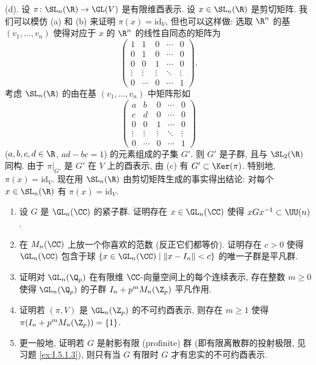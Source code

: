 \begin{solution}
(d). 设 $\pi \colon \SL_n(\R) \to \GL(V)$ 是有限维酉表示. 设 $x \in \SL_n(\R)$ 是剪切矩阵. 我们可以模仿 (a) 和 (b) 来证明 $\pi(x) = \mathrm{id}_V$, 但也可以这样做: 选取 $\R^n$ 的基 $(v_1, \ldots, v_n)$ 使得对应于 $x$ 的 $\R^n$ 的线性自同态的矩阵为
\[
\begin{pmatrix} 1 & 1 & 0 & \cdots & 0 \\ 0 & 1 & 0 & \cdots & 0 \\ 0 & 0 & 1 & \cdots & 0 \\ \vdots & \vdots & \vdots & \ddots & \vdots \\ 0 & \cdots & 0 & \cdots & 1 \end{pmatrix}.
\]
考虑 $\SL_n(\R)$ 的由在基 $(v_1, \ldots, v_n)$ 中矩阵形如
\[
\begin{pmatrix} a & b & 0 & \cdots & 0 \\ c & d & 0 & \cdots & 0 \\ 0 & 0 & 1 & \cdots & 0 \\ \vdots & \vdots & \vdots & \ddots & \vdots \\ 0 & \cdots & 0 & \cdots & 1 \end{pmatrix}
\]
($a, b, c, d \in \R$, $ad - bc = 1$) 的元素组成的子集 $G'$. 则 $G'$ 是子群, 且与 $\SL_2(\R)$ 同构. 由于 $\pi|_{G'}$ 是 $G'$ 在 $V$ 上的酉表示, 由 (c) 有 $G' \subset \Ker(\pi)$. 特别地, $\pi(x) = \mathrm{id}_V$.
现在用 $\SL_n(\R)$ 由剪切矩阵生成的事实得出结论: 对每个 $x \in \SL_n(\R)$ 有 $\pi(x) = \mathrm{id}_V$.
\end{solution}

\begin{exercise}[酉化、小球与忠实表示]
\label{ex:I.5.5.3}
\begin{enumerate}
\item[(a)] 设 $G$ 是 $\GL_n(\CC)$ 的紧子群. 证明存在 $x \in \GL_n(\CC)$ 使得 $xGx^{-1} \subset \UU(n)$.
\item[(b)] 在 $M_n(\CC)$ 上放一个你喜欢的范数 (反正它们都等价). 证明存在 $c > 0$ 使得 $\GL_n(\CC)$ 包含于球 $\{x \in \GL_n(\CC) \mid \|x - I_n\| < c\}$ 的唯一子群是平凡群.
\item[(c)] 证明对 $\GL_n(\Q_p)$ 在有限维 $\CC$-向量空间上的每个连续表示, 存在整数 $m \geq 0$ 使得 $\GL_n(\Q_p)$ 的子群 $I_n + p^mM_n(\Z_p)$ 平凡作用.
\item[(d)] 证明若 $(\pi, V)$ 是 $\GL_n(\Z_p)$ 的不可约酉表示, 则存在 $m \geq 1$ 使得 $\pi(I_n + p^mM_n(\Z_p)) = \{1\}$.
\item[(e)] 更一般地, 证明若 $G$ 是射影有限 (profinite) 群 (即有限离散群的投射极限, 见习题 \ref{ex:I.5.1.3}), 则只有当 $G$ 有限时 $G$ 才有忠实的不可约酉表示.
\end{enumerate}
\end{exercise}

